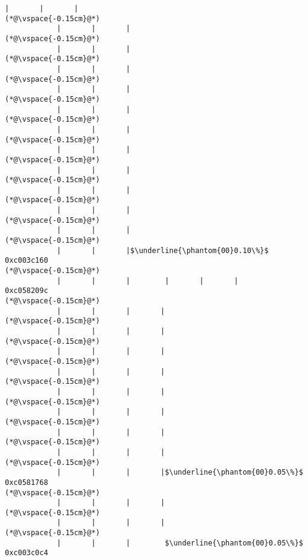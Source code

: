 \begin{lstlisting}[caption=20 viiteparametria Java$\to$C , label=profile:J2CBenchmark00206, numberbychapter=true, frame=lines, float, floatplacement=t]
            |       |       |
(*@\vspace{-0.15cm}@*)
            |       |       |
(*@\vspace{-0.15cm}@*)
            |       |       |
(*@\vspace{-0.15cm}@*)
            |       |       |
(*@\vspace{-0.15cm}@*)
            |       |       |
(*@\vspace{-0.15cm}@*)
            |       |       |
(*@\vspace{-0.15cm}@*)
            |       |       |
(*@\vspace{-0.15cm}@*)
            |       |       |
(*@\vspace{-0.15cm}@*)
            |       |       |
(*@\vspace{-0.15cm}@*)
            |       |       |
(*@\vspace{-0.15cm}@*)
            |       |       |
(*@\vspace{-0.15cm}@*)
            |       |       |
(*@\vspace{-0.15cm}@*)
            |       |       |$\underline{\phantom{00}0.10\%}$ 0xc003c160
(*@\vspace{-0.15cm}@*)
            |       |       |        |       |       |       0xc058209c
(*@\vspace{-0.15cm}@*)
            |       |       |       |
(*@\vspace{-0.15cm}@*)
            |       |       |       |
(*@\vspace{-0.15cm}@*)
            |       |       |       |
(*@\vspace{-0.15cm}@*)
            |       |       |       |
(*@\vspace{-0.15cm}@*)
            |       |       |       |
(*@\vspace{-0.15cm}@*)
            |       |       |       |
(*@\vspace{-0.15cm}@*)
            |       |       |       |
(*@\vspace{-0.15cm}@*)
            |       |       |       |
(*@\vspace{-0.15cm}@*)
            |       |       |       |$\underline{\phantom{00}0.05\%}$ 0xc0581768
(*@\vspace{-0.15cm}@*)
            |       |       |       |
(*@\vspace{-0.15cm}@*)
            |       |       |       |
(*@\vspace{-0.15cm}@*)
            |       |       |        $\underline{\phantom{00}0.05\%}$ 0xc003c0c4

\end{lstlisting}
